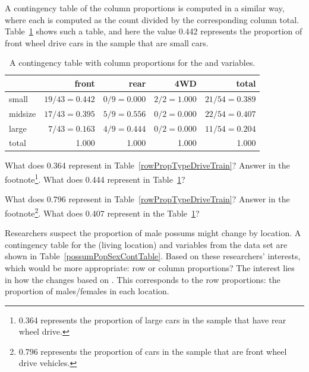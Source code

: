 A contingency table of the column proportions is computed in a similar way, where each  is computed as the count divided by the corresponding column total. Table~\ref{colPropTypeDriveTrain} shows such a table, and here the value 0.442 represents the proportion of front wheel drive cars in the sample that are small cars.
\begin{table}[ht]
\centering
\begin{tabular}{l | rrr | r}
  \hline
 & front & rear & 4WD & total \\ 
  \hline
small &  $19/43=0.442$ &  $0/9 = 0.000$  & $2/2=1.000$ & $21/54=0.389$ \\ 
midsize &  $17/43 = 0.395$ &  $5/9 = 0.556$ & $0/2 = 0.000$ & $22/54=0.407$ \\ 
large &  $7/43 = 0.163$  &   $4/9 = 0.444$  & $0/2 = 0.000$ & $11/54=0.204$ \\ 
   \hline
total & 1.000 & 1.000 & 1.000 & 1.000 \\
   \hline
\end{tabular}
\caption{A contingency table with column proportions for the  and  variables.} %
\label{colPropTypeDriveTrain}
\end{table}

\begin{exercise}
What does 0.364 represent in Table~\ref{rowPropTypeDriveTrain}? Answer in the footnote\footnote{0.364 represents the proportion of large cars in the sample that have rear wheel drive.}. What does 0.444 represent in Table~\ref{colPropTypeDriveTrain}?
\end{exercise}

\begin{exercise}
What does 0.796 represent in Table~\ref{rowPropTypeDriveTrain}? Answer in the footnote\footnote{0.796 represents the proportion of cars in the sample that are front wheel drive vehicles.}. What does 0.407 represent in the Table~\ref{colPropTypeDriveTrain}?
\end{exercise}

\begin{example}{Researchers suspect the proportion of male possums might change by location. A contingency table for the  (living location) and  variables from the  data set are shown in Table~\ref{possumPopSexContTable}. Based on these researchers' interests, which would be more appropriate: row or column proportions?} \label{weighingRowColumnProportions}
The interest lies in how the  changes based on . This corresponds to the row proportions: the proportion of males/females in each location.
\end{example}

